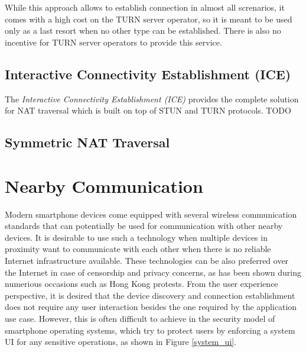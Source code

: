 While this approach allows to establish connection in almost all screnarios, it comes with a high cost on the TURN server operator, so it is meant to be used only as a last resort when no other type can be established. There is also no incentive for TURN server operators to provide this service.

\subsection{Interactive Connectivity Establishment (ICE)}

The \textit{Interactive Connectivity Establishment (ICE)} \cite{ice} provides the complete solution for NAT traversal which is built on top of STUN and TURN protocols. TODO


\subsection{Symmetric NAT Traversal}

\section{Nearby Communication}

Modern smartphone devices come equipped with several wireless communication standards that can potentially be used for communication with other nearby devices. It is desirable to use such a technology when multiple devices in proximity want to communicate with each other when there is no reliable Internet infrastructure available. These technologies can be also preferred over the Internet in case of censorship and privacy concerns, as has been shown during numerious occasions such as Hong Kong protests. From the user experience perspective, it is desired that the device discovery and connection establishment does not require any user interaction besides the one required by the application use case. However, this is often difficult to achieve in the security model of smartphone operating systems, which try to protect users by enforcing a system UI for any sensitive operations, as shown in Figure \ref{system_ui}.

